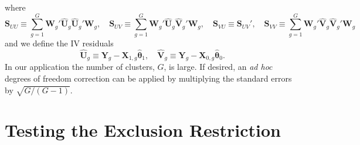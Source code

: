 where
\[
\mathbf{S}_{UU} \equiv \sum_{g=1}^G \mathbf{W}_g' \widehat{\mathbf{U}}_g \widehat{\mathbf{U}}_g' \mathbf{W}_g, \quad
\mathbf{S}_{UV} \equiv \sum_{g=1}^G \mathbf{W}_g' \widehat{\mathbf{U}}_g \widehat{\mathbf{V}}_g' \mathbf{W}_g, \quad
\mathbf{S}_{VU} \equiv \mathbf{S}_{UV}', \quad
\mathbf{S}_{VV} \equiv \sum_{g=1}^G \mathbf{W}_g' \widehat{\mathbf{V}}_g \widehat{\mathbf{V}}_g' \mathbf{W}_g
\]
and we define the IV residuals
\[
\widehat{\mathbf{U}}_g \equiv \mathbf{Y}_g - \mathbf{X}_{1,g}\widehat{\boldsymbol{\theta}}_1, \quad
\widehat{\mathbf{V}}_g \equiv \mathbf{Y}_g - \mathbf{X}_{0,g}\widehat{\boldsymbol{\theta}}_0.
\]
In our application the number of clusters, $G$, is large.
If desired, an \emph{ad hoc} degrees of freedom correction can be applied by multiplying the standard errors by $\sqrt{G/(G-1)}$.


\section{Testing the Exclusion Restriction}
\label{append:exclusion}

\normalsize
\linespread{1.05}
\normalsize
\linespread{1.05}

